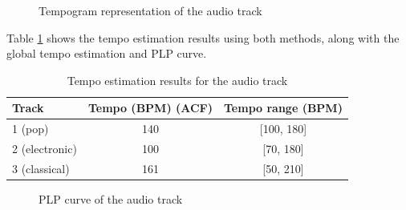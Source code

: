 \documentclass[
paper=A4,               %
pagesize=auto,          %
fontsize=12pt,          %
DIV=16,                 %
twoside=false,           %
BCOR=20mm,              %
parskip=false,          %
chapterprefix=true,     %
appendixprefix=true,    %
listof=totoc,           %
bibliography=totoc,     %
headinclude=true,       %
footinclude=false,      %
headsepline=false,       %
footsepline=false,      %
headings=small,         %
numbers=noenddot        %
] {scrbook}
\begin{document}
\begin{figure}[ht]
    \centering
    \caption{Tempogram representation of the audio track}
    \label{fig:tempogram}
\end{figure}
Table \ref{tab:results} shows the tempo estimation results using both methods, along with the global tempo estimation and PLP curve.
\begin{table}
    \centering
    \begin{tabular}{l|c|c}
        \toprule
        \textbf{Track} & \textbf{Tempo (BPM) (ACF)} & \textbf{Tempo range (BPM)} \\
        \midrule
        1 (pop) & 140& [100, 180]\\
        2 (electronic)& 100& [70, 180]\\
        3 (classical)& 161& [50, 210]\\
        \bottomrule
    \end{tabular}
    \caption{Tempo estimation results for the audio track}
    \label{tab:results}
\end{table}
\begin{figure}[bht]
    \centering
    \caption{PLP curve of the audio track}
    \label{fig:plp}
\end{figure}
\end{document}
